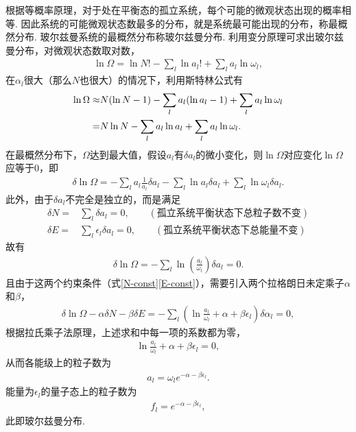 \documentclass{assignment}
\begin{document}
根据等概率原理，对于处在平衡态的孤立系统，每个可能的微观状态出现的概率相等. 因此系统的可能微观状态数最多的分布，就是系统最可能出现的分布，称最概然分布. 玻尔兹曼系统的最概然分布称玻尔兹曼分布. 利用变分原理可求出玻尔兹曼分布，对微观状态数取对数，
\begin{align}
    \ln\Omega=\ln N!-\sum_l\ln a_l!+\sum_l a_l\ln\omega_l,
\end{align}
在$\alpha_l$很大（那么$N$也很大）的情况下，利用斯特林公式有
\begin{align}
    \notag\ln\Omega\approx&N(\ln N-1)-\sum_la_l(\ln a_l-1)+\sum_l a_l\ln\omega_l\\
    =&N\ln N-\sum_l a_l\ln a_l+\sum_l a_l\ln\omega_l.
\end{align}
在最概然分布下，$\Omega$达到最大值，假设$a_l$有$\delta a_l$的微小变化，则$\ln\Omega$对应变化$\ln\Omega$应等于$0$，即
\begin{align}
    \delta\ln\Omega=-\sum_la_l\frac{1}{a_l}\delta a_l-\sum_l\ln a_l\delta a_l+\sum_l\ln\omega_l\delta a_l.
\end{align}
此外，由于$\delta a_l$不完全是独立的，而是满足
\begin{align}
    \label{N-const}\delta N=&\sum_l\delta a_l=0,\qquad(\text{孤立系统平衡状态下总粒子数不变})\\
    \label{E-const}\delta E=&\sum_l\epsilon_l\delta a_l=0,\qquad(\text{孤立系统平衡状态下总能量不变})
\end{align}
故有
\begin{align}
    \delta\ln\Omega=-\sum_l\ln\left(\frac{a_l}{\omega_l}\right)\delta a_l=0.
\end{align}
且由于这两个约束条件（式\eqref{N-const}\eqref{E-const}），需要引入两个拉格朗日未定乘子$\alpha$和$\beta$，
\begin{align}
    \delta\ln\Omega-\alpha\delta N-\beta\delta E=-\sum_l\left(\ln\frac{a_l}{\omega_l}+\alpha+\beta\epsilon_l\right)\delta\alpha_l=0,
\end{align}
根据拉氏乘子法原理，上述求和中每一项的系数都为零，
\begin{align}
    \ln\frac{a_l}{\omega_l}+\alpha+\beta\epsilon_l=0,
\end{align}
从而各能级上的粒子数为
\begin{align}
    a_l=\omega_le^{-\alpha-\beta\epsilon_l}.
\end{align}
能量为$\epsilon_l$的量子态上的粒子数为
\begin{align}
    f_l=e^{-\alpha-\beta\epsilon_l},
\end{align}
此即玻尔兹曼分布.
\end{document}
